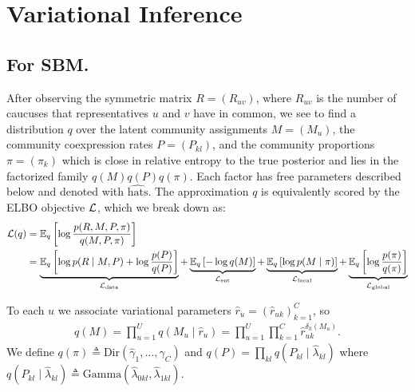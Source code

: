\documentclass{article}
\begin{document}
\newpage

\section{Variational Inference}
\label{vi}

\subsection{For SBM.} After observing the symmetric matrix $R = (R_{uv})$, where $R_{uv}$ is the number of caucuses that representatives $u$ and $v$ have in common, we see to find a distribution $q$ over the latent community assignments $M = (M_u)$, the community coexpression rates $P = (P_{kl})$, and the community proportions $\pi = (\pi_k)$ which is close in relative entropy to the true posterior and lies in the factorized family $q(M)q(P)q(\pi)$. Each factor has free parameters described below and denoted with $\widehat{\text{hats}}$. The approximation $q$ is equivalently scored by the ELBO objective $\mathcal{L}$, which we break down as:%
\begin{equation}
\begin{split}
\mathcal{L}(q)
&= \mathbb{E}_q\left[\log\frac{p(R,M,P,\pi)}{q(M,P,\pi)}\right]  \\
&= \underbrace{\mathbb{E}_q\left[\log p(R\mid M,P)+ \log\frac{p(P)}{q(P)}\right]}_{\mathcal{L}_{\text{data}}}
+ \underbrace{\mathbb{E}_q\left[-\log q(M)\right]}_{\mathcal{L}_{\text{ent}}}
+ \underbrace{\mathbb{E}_q\left[\log p(M\mid \pi)\right]}_{\mathcal{L}_{\text{local}}}
+ \underbrace{\mathbb{E}_q\left[\log\frac{p(\pi)}{q(\pi)}\right]}_{\mathcal{L}_{\text{global}}}
\end{split}
\end{equation}

 To each $u$ we associate variational parameters $\widehat r_u = \left(\widehat r_{uk}\right)_{k=1}^C$, so
\begin{align}
q(M) = \prod_{u=1}^U q(M_u\mid \widehat r_u) 
= \prod_{u=1}^U \prod_{k=1}^C \widehat r_{uk}^{\delta_k(M_u)}.
\end{align}
We define $q(\pi) \triangleq \text{Dir}(\widehat \gamma_1, \dots, \widehat \gamma_C)$ and $q(P) = \prod_{kl}q(P_{kl}\mid \widehat \lambda_{kl})$ where $q(P_{kl}\mid \widehat \lambda_{kl})\triangleq \text{Gamma}(\widehat \lambda_{0kl},\widehat \lambda_{1kl})$. \\
\end{document}
